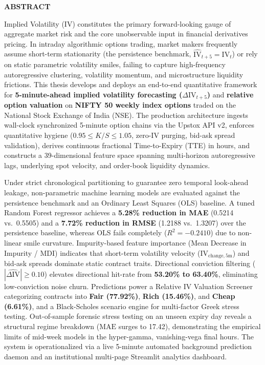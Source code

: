\documentclass[11pt,oneside]{report}
\begin{document}
\newpage
\thispagestyle{plain}
{}
\onehalfspacing
\begin{center}
    \textbf{\LARGE ABSTRACT} \\[0.6cm]
\end{center}

\noindent
Implied Volatility (IV) constitutes the primary forward-looking gauge of aggregate market risk and the core unobservable input in financial derivatives pricing. In intraday algorithmic options trading, market makers frequently assume short-term stationarity (the persistence benchmark, $\widehat{\text{IV}}_{t+5} = \text{IV}_t$) or rely on static parametric volatility smiles, failing to capture high-frequency autoregressive clustering, volatility momentum, and microstructure liquidity frictions. This thesis develops and deploys an end-to-end quantitative framework for \textbf{5-minute-ahead implied volatility forecasting ($\Delta \text{IV}_{t+5}$)} and \textbf{relative option valuation} on \textbf{NIFTY 50 weekly index options} traded on the National Stock Exchange of India (NSE). The production architecture ingests wall-clock synchronized 5-minute option chains via the Upstox API v2, enforces quantitative hygiene ($0.95 \le K/S \le 1.05$, zero-IV purging, bid-ask spread validation), derives continuous fractional Time-to-Expiry (TTE) in hours, and constructs a 39-dimensional feature space spanning multi-horizon autoregressive lags, underlying spot velocity, and order-book liquidity dynamics.

\vspace{0.35cm}
\noindent
Under strict chronological partitioning to guarantee zero temporal look-ahead leakage, non-parametric machine learning models are evaluated against the persistence benchmark and an Ordinary Least Squares (OLS) baseline. A tuned Random Forest regressor achieves a \textbf{5.28\% reduction in MAE} (0.5214 vs.\ 0.5505) and a \textbf{7.72\% reduction in RMSE} (1.2188 vs.\ 1.3207) over the persistence baseline, whereas OLS fails completely ($R^2 = -0.2410$) due to non-linear smile curvature. Impurity-based feature importance (Mean Decrease in Impurity / MDI) indicates that short-term volatility velocity ($\text{IV}_{\text{change}, 5\text{m}}$) and bid-ask spreads dominate static contract traits. Directional conviction filtering ($|\widehat{\Delta\text{IV}}| \ge 0.10$) elevates directional hit-rate from \textbf{53.20\% to 63.40\%}, eliminating low-conviction noise churn. Predictions power a Relative IV Valuation Screener categorizing contracts into \textbf{Fair (77.92\%)}, \textbf{Rich (15.46\%)}, and \textbf{Cheap (6.61\%)}, and a Black-Scholes scenario engine for multi-factor Greek stress testing. Out-of-sample forensic stress testing on an unseen expiry day reveals a structural regime breakdown ($\text{MAE}$ surges to 17.42), demonstrating the empirical limits of mid-week models in the hyper-gamma, vanishing-vega final hours. The system is operationalized via a live 5-minute automated background prediction daemon and an institutional multi-page Streamlit analytics dashboard.
\end{document}

